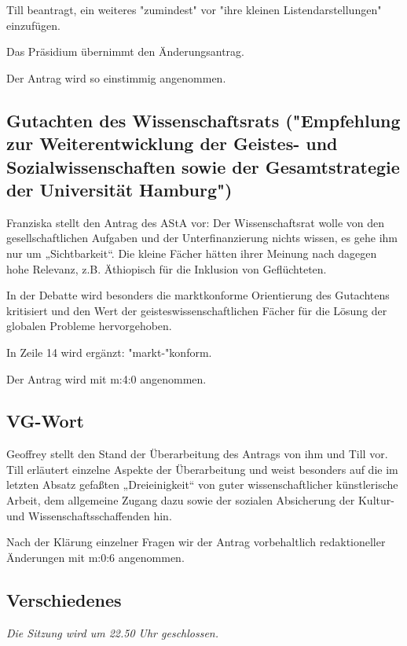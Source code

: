 \documentclass[ngerman,headheight=70pt]{scrartcl}
\begin{document}
    Till beantragt, ein weiteres "zumindest" vor "ihre kleinen
    Listendarstellungen" einzufügen.

    Das Präsidium übernimmt den Änderungsantrag.

    Der Antrag wird so einstimmig angenommen.

    \subsection{Gutachten des Wissenschaftsrats ("Empfehlung zur
    Weiterentwicklung der Geistes- und Sozialwissenschaften sowie der
    Gesamtstrategie der Universität Hamburg")}

    Franziska stellt den Antrag des AStA vor: Der Wissenschaftsrat wolle von den
    gesellschaftlichen Aufgaben und der Unterfinanzierung nichts wissen, es gehe
    ihm nur um „Sichtbarkeit“. Die kleine Fächer hätten ihrer Meinung nach
    dagegen hohe Relevanz, z.B. Äthiopisch für die Inklusion von Geflüchteten.

    In der Debatte wird besonders die marktkonforme Orientierung des Gutachtens
    kritisiert und den Wert der geisteswissenschaftlichen Fächer für die Lösung
    der globalen Probleme hervorgehoben.

    In Zeile 14 wird ergänzt: "markt-"konform.

    Der Antrag wird mit m:4:0 angenommen.

    \subsection{VG-Wort}

    Geoffrey stellt den Stand der Überarbeitung des Antrags von ihm und Till vor.  Till erläutert einzelne Aspekte der Überarbeitung und weist besonders auf die im letzten Absatz gefaßten „Dreieinigkeit“ von guter wissenschaftlicher künstlerische Arbeit, dem allgemeine Zugang dazu sowie der sozialen Absicherung der Kultur- und Wissenschaftsschaffenden hin.

    Nach der Klärung einzelner Fragen wir der Antrag vorbehaltlich redaktioneller
    Änderungen mit m:0:6 angenommen.

    \subsection{Verschiedenes}

    \textit{Die Sitzung wird um 22.50 Uhr geschlossen.}
\end{document}
